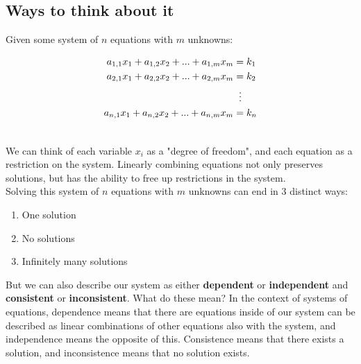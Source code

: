 \documentclass[../main.tex]{subfiles}
\begin{document}
\subsection{Ways to think about it}
Given some system of $n$ equations with $m$ unknowns:
\begin{center}
	\begin{align}
		a_{1,1}x_1 + a_{1,2}x_2 + ... + a_{1,m}x_m &= k_1 \\ \notag
		a_{2,1}x_1 + a_{2,2}x_2 + ... + a_{2,m}x_m &= k_2 \\ \notag
							   &\;\;\vdots\\ \notag
		a_{n,1}x_1 + a_{n,2}x_2 + ... + a_{n,m}x_m &= k_n \\ \notag
	\end{align}
\end{center}
We can think of each variable $x_i$ as a "degree of freedom", and each equation as a restriction on the system. Linearly combining equations not only preserves solutions, but has the ability to free up restrictions in the system. \\

\noindent
Solving this system of $n$ equations with $m$ unknowns can end in 3 distinct ways:
\begin{enumerate}
	\item One solution
	\item No solutions
	\item Infinitely many solutions
\end{enumerate}
But we can also describe our system as either \textbf{dependent} or \textbf{independent} and \textbf{consistent} or \textbf{inconsistent}. What do these mean? In the context of systems of equations, dependence means that there are equations inside of our system can be described as linear combinations of other equations also with the system, and independence means the opposite of this. Consistence means that there exists a solution, and inconsistence means that no solution exists.
\end{document}
